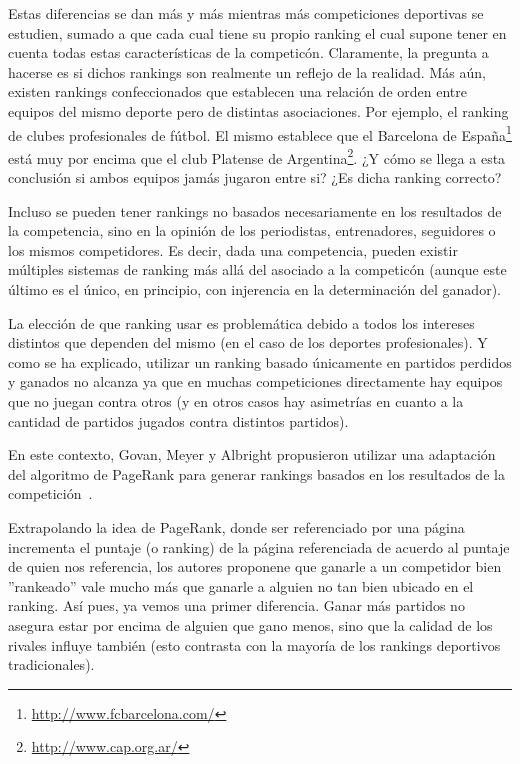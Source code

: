 \par Estas diferencias se dan m\'as y m\'as mientras m\'as competiciones
deportivas se estudien, sumado a que cada cual tiene su propio ranking el cual
supone tener en cuenta todas estas caracter\'isticas de la competic\'on.
Claramente, la pregunta a hacerse es si dichos rankings son realmente un reflejo
de la realidad. M\'as a\'un, existen rankings confeccionados que establecen una
relaci\'on de orden entre equipos del mismo deporte pero de distintas
asociaciones. Por ejemplo, el ranking de clubes profesionales de f\'utbol. El
mismo establece que el Barcelona de
Espa\~na\footnote{\url{http://www.fcbarcelona.com/}} est\'a muy por encima que
el club Platense de Argentina\footnote{\url{http://www.cap.org.ar/}}. ¿Y c\'omo
se llega a esta conclusi\'on si ambos equipos jam\'as jugaron entre si? ¿Es
dicha ranking correcto?

\par Incluso se pueden tener rankings no basados necesariamente en los
resultados de la competencia, sino en la opini\'on de los periodistas,
entrenadores, seguidores o los mismos competidores. Es decir, dada una
competencia, pueden existir m\'ultiples sistemas de ranking m\'as all\'a del
asociado a la competic\'on (aunque este \'ultimo es el \'unico, en principio,
con injerencia en la determinaci\'on del ganador).

\par La elecci\'on de que ranking usar es problem\'atica debido a todos los
intereses distintos que dependen del mismo (en el caso de los deportes
profesionales). Y como se ha explicado, utilizar un ranking basado \'unicamente
en partidos perdidos y ganados no alcanza ya que en muchas competiciones
directamente hay equipos que no juegan contra otros (y en otros casos hay
asimetr\'ias en cuanto a la cantidad de partidos jugados contra distintos
partidos).

\par En este contexto, Govan, Meyer y Albright propusieron utilizar una
adaptaci\'on del algoritmo de PageRank para generar rankings basados en los
resultados de la competici\'on~\cite{Govan2008}.

\par Extrapolando la idea de PageRank, donde ser referenciado por una p\'agina
incrementa el puntaje (o ranking) de la p\'agina referenciada de acuerdo al
puntaje de quien nos referencia, los autores proponene que ganarle a un
competidor bien ''rankeado'' vale mucho m\'as que ganarle a alguien no tan bien
ubicado en el ranking. As\'i pues, ya vemos una primer diferencia. Ganar m\'as
partidos no asegura estar por encima de alguien que gano menos, sino que la
calidad de los rivales influye tambi\'en (esto contrasta con la mayor\'ia de los
rankings deportivos tradicionales).

